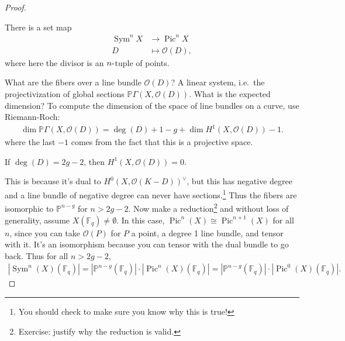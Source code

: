 \begin{proof}

\begin{claim}

There is a set map
\begin{align*}  
\operatorname{Sym}^n X &\to {\operatorname{Pic}}^n X \\
D &\mapsto {\mathcal{O}}(D)
,\end{align*}
where here the divisor is an \(n{\hbox{-}}\)tuple of points.

\end{claim}

What are the fibers over a line bundle \({\mathcal{O}}(D)\)? A linear
system, i.e.~the projectivization of global sections
\({\mathbb{P}}\Gamma(X, {\mathcal{O}}(D))\). What is the expected
dimension? To compute the dimension of the space of line bundles on a
curve, use Riemann-Roch:
\begin{align*}  
\dim {\mathbb{P}}\Gamma(X, {\mathcal{O}}(D)) = \deg(D) + 1 - g + \dim H^1(X, {\mathcal{O}}(D)) - 1
.\end{align*}
where the last \(-1\) comes from the fact that this is a projective
space.

\begin{claim}

If \(\deg(D) = 2g-2\), then \(H^1(X, {\mathcal{O}}(D)) = 0\).

\end{claim}

This is because it's dual to \(H^0(X, {\mathcal{O}}(K-D))^\vee\), but
this has negative degree and a line bundle of negative degree can never
have sections.\footnote{You should check to make sure you know why this
  is true!} Thus the fibers are isomorphic to \({\mathbb{P}}^{n-g}\) for
\(n>2g-2\). Now make a reduction\footnote{Exercise: justify why the
  reduction is valid.} and without loss of generality, assume
\(X({\mathbb{F}}_q) \neq \emptyset\). In this case,
\({\operatorname{Pic}}^n(X) \cong {\operatorname{Pic}}^{n+1}(X)\) for
all \(n\), since you can take \({\mathcal{O}}(P)\) for \(P\) a point, a
degree 1 line bundle, and tensor with it. It's an isomorphism because
you can tensor with the dual bundle to go back. Thus for all \(n>2g-2\),
\begin{align*}  
{\left\lvert {\operatorname{Sym}^n(X)({\mathbb{F}}_q)} \right\rvert} 
= {\left\lvert {{\mathbb{P}}^{n-g}({\mathbb{F}}_q)} \right\rvert} \cdot {\left\lvert {{\operatorname{Pic}}^n(X)({\mathbb{F}}_q)} \right\rvert}
= {\left\lvert {{\mathbb{P}}^{n-g}({\mathbb{F}}_q)} \right\rvert} \cdot {\left\lvert {{\operatorname{Pic}}^0(X)({\mathbb{F}}_q)} \right\rvert}
.\end{align*}


\end{proof}
